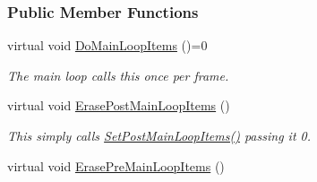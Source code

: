 \subsubsection*{Public Member Functions}
\begin{DoxyCompactItemize}
\item 
virtual void \hyperlink{classMezzanine_1_1ManagerBase_a4ee29e4baf6c4b9a3bfec1b2258d5cd2}{DoMainLoopItems} ()=0
\begin{DoxyCompactList}\small\item\em The main loop calls this once per frame. \item\end{DoxyCompactList}\item 
\hypertarget{classMezzanine_1_1ManagerBase_acff151003c2370c857dadb67148faffc}{
virtual void \hyperlink{classMezzanine_1_1ManagerBase_acff151003c2370c857dadb67148faffc}{ErasePostMainLoopItems} ()}
\label{classMezzanine_1_1ManagerBase_acff151003c2370c857dadb67148faffc}

\begin{DoxyCompactList}\small\item\em This simply calls \hyperlink{classMezzanine_1_1ManagerBase_a4ec52058f4c8a3f1c5fb20230b4fc301}{SetPostMainLoopItems()} passing it 0. \item\end{DoxyCompactList}\item 
\hypertarget{classMezzanine_1_1ManagerBase_a1f1b8b02c34ccfd72040a7183fc3cba1}{
virtual void \hyperlink{classMezzanine_1_1ManagerBase_a1f1b8b02c34ccfd72040a7183fc3cba1}{ErasePreMainLoopItems} ()}
\label{classMezzanine_1_1ManagerBase_a1f1b8b02c34ccfd72040a7183fc3cba1}


\end{DoxyCompactItemize}
